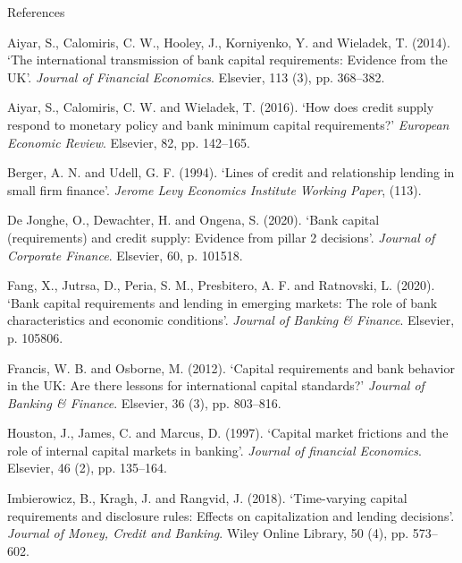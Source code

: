 \documentclass[
  14,
  ignorenonframetext,
  aspectratio=141,
]{beamer}
\newlength{\cslhangindent}
\newlength{\cslentryspacingunit} %
\newenvironment{CSLReferences}[2] %
 {%
  \setlength{\parindent}{0pt}
  \ifodd #1
  \let\oldpar\par
  \def\par{\hangindent=\cslhangindent\oldpar}
  \fi
  \setlength{\parskip}{#2\cslentryspacingunit}
 }%
 {}
\begin{document}
\begin{frame}[allowframebreaks]{References}
\protect\hypertarget{references}{}
\hypertarget{refs}{}
\begin{CSLReferences}{0}{0}
\leavevmode{}%
Aiyar, S., Calomiris, C. W., Hooley, J., Korniyenko, Y. and Wieladek, T.
(2014). {`The international transmission of bank capital requirements:
Evidence from the UK'}. \emph{Journal of Financial Economics}. Elsevier,
113 (3), pp. 368--382.

\leavevmode{}%
Aiyar, S., Calomiris, C. W. and Wieladek, T. (2016). {`How does credit
supply respond to monetary policy and bank minimum capital
requirements?'} \emph{European Economic Review}. Elsevier, 82, pp.
142--165.

\leavevmode{}%
Berger, A. N. and Udell, G. F. (1994). {`Lines of credit and
relationship lending in small firm finance'}. \emph{Jerome Levy
Economics Institute Working Paper}, (113).

\leavevmode{}%
De Jonghe, O., Dewachter, H. and Ongena, S. (2020). {`Bank capital
(requirements) and credit supply: Evidence from pillar 2 decisions'}.
\emph{Journal of Corporate Finance}. Elsevier, 60, p. 101518.

\leavevmode{}%
Fang, X., Jutrsa, D., Peria, S. M., Presbitero, A. F. and Ratnovski, L.
(2020). {`Bank capital requirements and lending in emerging markets: The
role of bank characteristics and economic conditions'}. \emph{Journal of
Banking \& Finance}. Elsevier, p. 105806.

\leavevmode{}%
Francis, W. B. and Osborne, M. (2012). {`Capital requirements and bank
behavior in the UK: Are there lessons for international capital
standards?'} \emph{Journal of Banking \& Finance}. Elsevier, 36 (3), pp.
803--816.

\leavevmode{}%
Houston, J., James, C. and Marcus, D. (1997). {`Capital market frictions
and the role of internal capital markets in banking'}. \emph{Journal of
financial Economics}. Elsevier, 46 (2), pp. 135--164.

\leavevmode{}%
Imbierowicz, B., Kragh, J. and Rangvid, J. (2018). {`Time-varying
capital requirements and disclosure rules: Effects on capitalization and
lending decisions'}. \emph{Journal of Money, Credit and Banking}. Wiley
Online Library, 50 (4), pp. 573--602.


\end{CSLReferences}
\end{frame}
\end{document}
